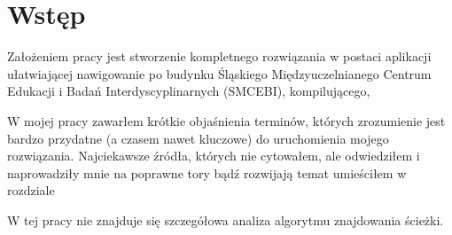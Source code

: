 \section{Wstęp}

Założeniem pracy jest stworzenie kompletnego rozwiązania w postaci aplikacji ułatwiającej
nawigowanie po budynku Śląskiego Międzyuczelnianego Centrum Edukacji i Badań Interdyscyplinarnych (SMCEBI),
kompilującego, 

    W mojej pracy zawarłem krótkie objaśnienia terminów, których zrozumienie jest bardzo przydatne
(a czasem nawet kluczowe) do uruchomienia mojego rozwiązania. Najciekawsze źródła, których nie cytowałem,
ale odwiedziłem i naprowadziły mnie na poprawne tory bądź rozwijają temat umieściłem w rozdziale

    W tej pracy nie znajduje się szczegółowa analiza algorytmu znajdowania ścieżki.